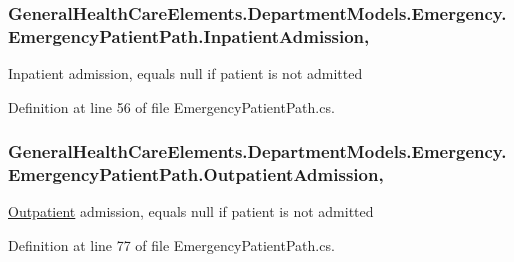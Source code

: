 \subsubsection[{\texorpdfstring{Inpatient\+Admission}{InpatientAdmission}}]{ General\+Health\+Care\+Elements.\+Department\+Models.\+Emergency.\+Emergency\+Patient\+Path.\+Inpatient\+Admission\hspace{0.3cm}{\ttfamily [get]}, {\ttfamily [set]}}\hypertarget{class_general_health_care_elements_1_1_department_models_1_1_emergency_1_1_emergency_patient_path_a386a429226723fbc8bd83012dccd8fbb}{}\label{class_general_health_care_elements_1_1_department_models_1_1_emergency_1_1_emergency_patient_path_a386a429226723fbc8bd83012dccd8fbb}


Inpatient admission, equals null if patient is not admitted 



Definition at line 56 of file Emergency\+Patient\+Path.\+cs.

\subsubsection[{\texorpdfstring{Outpatient\+Admission}{OutpatientAdmission}}]{ General\+Health\+Care\+Elements.\+Department\+Models.\+Emergency.\+Emergency\+Patient\+Path.\+Outpatient\+Admission\hspace{0.3cm}{\ttfamily [get]}, {\ttfamily [set]}}\hypertarget{class_general_health_care_elements_1_1_department_models_1_1_emergency_1_1_emergency_patient_path_a16e4a1e5e90c97479e23d75da3efae13}{}\label{class_general_health_care_elements_1_1_department_models_1_1_emergency_1_1_emergency_patient_path_a16e4a1e5e90c97479e23d75da3efae13}


\hyperlink{namespace_general_health_care_elements_1_1_department_models_1_1_outpatient}{Outpatient} admission, equals null if patient is not admitted 



Definition at line 77 of file Emergency\+Patient\+Path.\+cs.


